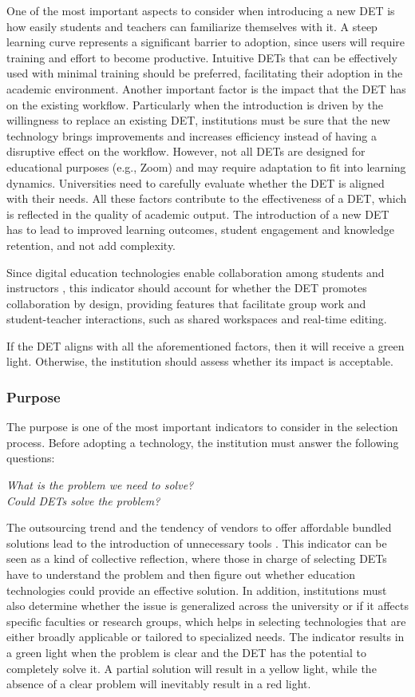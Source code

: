One of the most important aspects to consider when introducing a new DET is how easily students and teachers can familiarize themselves with it. A steep learning curve represents a significant barrier to adoption, since users will require training and effort to become productive. Intuitive DETs that can be effectively used with minimal training should be preferred, facilitating their adoption in the academic environment. Another important factor is the impact that the DET has on the existing workflow. Particularly when the introduction is driven by the willingness to replace an existing DET, institutions must be sure that the new technology brings improvements and increases efficiency instead of having a disruptive effect on the workflow. However, not all DETs are designed for educational purposes (e.g., Zoom) and may require adaptation to fit into learning dynamics. Universities need to carefully evaluate whether the DET is aligned with their needs. All these factors contribute to the effectiveness of a DET, which is reflected in the quality of academic output. The introduction of a new DET has to lead to improved learning outcomes, student engagement and knowledge retention, and not add complexity.

Since digital education technologies enable collaboration among students and instructors \cite{sokhulu_students_2021}, this indicator should account for whether the DET promotes collaboration by design, providing features that facilitate group work and student-teacher interactions, such as shared workspaces and real-time editing.  

If the DET aligns with all the aforementioned factors, then it will receive a green light. Otherwise, the institution should assess whether its impact is acceptable.

\subsubsection{Purpose}
The purpose is one of the most important indicators to consider in the selection process. Before adopting a technology, the institution must answer the following questions:
\begin{center}
    \textit{What is the problem we need to solve?} \\
    \textit{Could DETs solve the problem?} 
\end{center}
The outsourcing trend and the tendency of vendors to offer affordable bundled solutions lead to the introduction of unnecessary tools \cite{komljenovic_rise_2021}. This indicator can be seen as a kind of collective reflection, where those in charge of selecting DETs have to understand the problem and then figure out whether education technologies could provide an effective solution.
In addition, institutions must also determine whether the issue is generalized across the university or if it affects specific faculties or research groups, which helps in selecting technologies that are either broadly applicable or tailored to specialized needs.
The indicator results in a green light when the problem is clear and the DET has the potential to completely solve it. A partial solution will result in a yellow light, while the absence of a clear problem will inevitably result in a red light.

